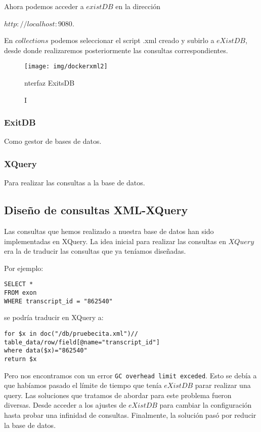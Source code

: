 \documentclass[12pt,a4paper]{article}
\begin{document}
\begin{enumerate}
Ahora podemos acceder a $existDB$ en la dirección
  
$http://localhost:9080$.

En $collections$ podemos seleccionar el script .xml creado y subirlo a $eXistDB$, desde donde realizaremos posteriormente las consultas correspondientes. 


\begin{figure}[!h]
\centering 
\texttt{[image: img/dockerxml2]}
\caption Interfaz ExitsDB
\label{interfazxdb}
\end{figure}
\end{enumerate}

\subsubsection{ExitDB} Como gestor de bases de datos. \label{pto412}

\subsubsection{XQuery} Para realizar las consultas a la base de datos. \label{pto413}


\newpage
\subsection{Diseño de consultas XML-XQuery}  \label{pto42}

Las consultas que hemos realizado a nuestra base de datos han sido implementadas en XQuery. La idea inicial para realizar las consultas en $XQuery$ era la de traducir las consultas que ya teníamos diseñadas.

Por ejemplo:

 \begin{verbatim}
SELECT *
FROM exon
WHERE transcript_id = "862540"
 \end{verbatim}
 
se podría traducir en XQuery a:

\begin{verbatim}
for $x in doc("/db/pruebecita.xml")//
table_data/row/field[@name="transcript_id"]
where data($x)="862540"
return $x
\end{verbatim}


Pero nos encontramos con un error \verb|GC overhead limit exceded|. Esto se debía a que habíamos pasado el límite de tiempo que tenía $eXistDB$ parar realizar una query. Las soluciones que tratamos de abordar para este problema fueron diversas. Desde acceder a los ajustes de $eXistDB$ para cambiar la configuración hasta probar una infinidad de consultas. Finalmente, la solución pasó por reducir la base de datos.
\end{document}
